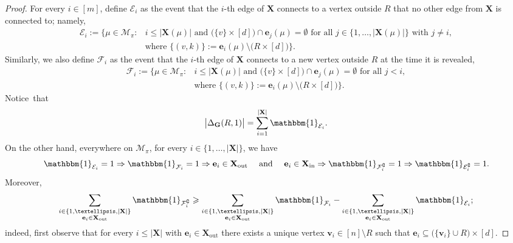\documentclass[11pt,leqno]{amsart}
\theoremstyle{remark}
\theoremstyle{plain}
\begin{document}
\begin{proof}
For every $i\in [m]$, define $\mathcal{E}_i$ as the event that the $i$-th edge of $\mathbf{X}$ connects to a vertex outside $R$
that no other edge from $\mathbf{X}$ is connected to; namely,
\begin{align*}
\mathcal{E}_i := \Big\{ \mu\in \mathcal{M}_{\pi} \colon & i\leqslant |\mathbf{X}(\mu)| \text{ and } \big(\{v\}\times[d]\big) \cap \mathbf{e}_j(\mu) = \emptyset
\text{ for all } j\in \big\{1,\dots,|\mathbf{X}(\mu)|\big\} \text{ with } j\neq i, \\
& \text{where } \big\{(v,k)\big\} := \mathbf{e}_i(\mu)\setminus \big(R\times [d]\big) \Big\}.
\end{align*}
Similarly, we also define $\mathcal{F}_i$ as the event that the $i$-th edge of $\mathbf{X}$ connects
to a new vertex outside $R$ at the time it is revealed,
\begin{align*}
\mathcal{F}_i := \Big\{ \mu\in \mathcal{M}_{\pi}\colon & i\leqslant |\mathbf{X}(\mu)| \text{ and } \big(\{v\}\times[d]\big) \cap \mathbf{e}_j(\mu) = \emptyset
\text{ for all } j < i, \\
& \text{where } \big\{(v,k)\big\} := \mathbf{e}_i(\mu)\setminus \big(R\times [d]\big) \Big\}.
\end{align*}
Notice~that
\[ \big|\Delta_{\mathbf{G}}(R,1)\big| = \sum_{i=1}^{|\mathbf{X}|} \mathbbm{1}_{\mathcal{E}_i}. \]
On the other hand, everywhere on $\mathcal{M}_\pi$, for every $i\in \big\{1,\dots,|\mathbf{X}|\big\}$, we have
\[ \mathbbm{1}_{\mathcal{E}_i}=1 \Rightarrow \mathbbm{1}_{\mathcal{F}_i} =1 \Rightarrow
\mathbf{e}_i\in \mathbf{X}_{\mathrm{out}} \ \ \ \text{ and } \ \ \
\mathbf{e}_i\in \mathbf{X}_{\mathrm{in}} \Rightarrow \mathbbm{1}_{\mathcal{F}_i^\complement} =1
\Rightarrow \mathbbm{1}_{\mathcal{E}_i^\complement} =1. \]
Moreover,
\begin{equation} \label{malakia}
\sum_{\substack{i\in \{1,\dots,|\mathbf{X}|\}\\\mathbf{e}_i\in \mathbf{X}_\mathrm{out}}} \mathbbm{1}_{\mathcal{F}_i^\complement} \geqslant
\sum_{\substack{i\in \{1,\dots,|\mathbf{X}|\}\\ \mathbf{e}_i\in \mathbf{X}_\mathrm{out}}} \mathbbm{1}_{\mathcal{F}_i} -
\sum_{\substack{i\in \{1,\dots,|\mathbf{X}|\}\\ \mathbf{e}_i\in \mathbf{X}_\mathrm{out}}} \mathbbm{1}_{\mathcal{E}_i};
\end{equation}
indeed, first observe that for every $i\leqslant |\mathbf{X}|$ with $\mathbf{e}_i\in \mathbf{X}_\mathrm{out}$ there exists
a unique vertex $\mathbf{v}_i\in [n]\setminus R$ such that $\mathbf{e}_i\subseteq \big(\{\mathbf{v}_i\}\cup R\big)\times [d]$.

\end{proof}
\end{document}
